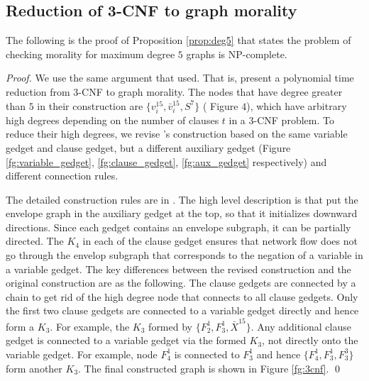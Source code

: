 \subsection{Reduction of 3-CNF to graph morality}
The following is the proof of Proposition \ref{prop:deg5} that states the problem of checking morality for maximum degree $5$ graphs is NP-complete. 
\begin{proof}
We use the same argument that \citeauthor{verma1993deciding} used. That is, present a polynomial time reduction from 3-CNF to graph morality. The nodes that have degree greater than $5$ in their construction are $\{v_i^{15},\bar{v}_i^{15}, S^7\}$ (\cite{verma1993deciding} Figure $4$), which have arbitrary high degrees depending on the number of clauses $t$ in a 3-CNF problem. To reduce their high degrees, we revise \citeauthor{verma1993deciding}'s construction based on the same variable gedget and clause gedget, but a different auxiliary gedget (Figure \ref{fg:variable_gedget}, \ref{fg:clause_gedget}, \ref{fg:aux_gedget} respectively) and different connection rules. 

The detailed construction rules are in \cite{verma1993deciding}. The high level description is that put the envelope graph in the auxiliary gedget at the top, so that it initializes downward directions. Since each gedget contains an envelope subgraph, it can be partially directed. The $K_4$ in each of the clause gedget ensures that network flow does not go through the envelop subgraph that corresponds to the negation of a variable in a variable gedget. The key differences between the revised construction and the original construction are as the following. The clause gedgets are connected by a chain to get rid of the high degree node that connects to all clause gedgets. Only the first two clause gedgets are connected to a variable gedget directly and hence form a $K_3$. For example, the $K_3$ formed by $\{F_2^1,F_3^1,\bar{X}^{15}\}$. Any additional clause gedget is connected to a variable gedget via the formed $K_3$, not directly onto the variable gedget. For example, node $F_4^1$ is connected to $F_3^1$ and hence $\{F_4^1,F_3^1,F_3^3\}$ form another $K_3$. The final constructed graph is shown in Figure \ref{fg:3cnf}. \qed
\end{proof}
